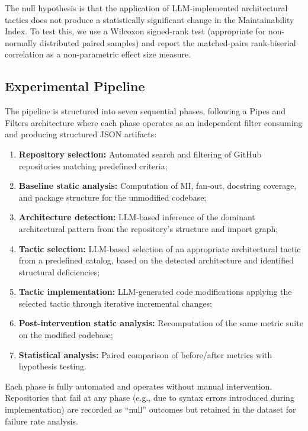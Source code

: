 \documentclass[sigconf,review,anonymous]{acmart}
\begin{document}
The null hypothesis is that the application of LLM-implemented architectural tactics does not produce a statistically significant change in the Maintainability Index. To test this, we use a Wilcoxon signed-rank test (appropriate for non-normally distributed paired samples) and report the matched-pairs rank-biserial correlation as a non-parametric effect size measure.

\subsection{Experimental Pipeline}
The pipeline is structured into seven sequential phases, following a Pipes and Filters architecture where each phase operates as an independent filter consuming and producing structured JSON artifacts:
\begin{enumerate}[nosep]
    \item \textbf{Repository selection:} Automated search and filtering of GitHub repositories matching predefined criteria;
    \item \textbf{Baseline static analysis:} Computation of MI, fan-out, docstring coverage, and package structure for the unmodified codebase;
    \item \textbf{Architecture detection:} LLM-based inference of the dominant architectural pattern from the repository's structure and import graph;
    \item \textbf{Tactic selection:} LLM-based selection of an appropriate architectural tactic from a predefined catalog, based on the detected architecture and identified structural deficiencies;
    \item \textbf{Tactic implementation:} LLM-generated code modifications applying the selected tactic through iterative incremental changes;
    \item \textbf{Post-intervention static analysis:} Recomputation of the same metric suite on the modified codebase;
    \item \textbf{Statistical analysis:} Paired comparison of before/after metrics with hypothesis testing.
\end{enumerate}

Each phase is fully automated and operates without manual intervention. Repositories that fail at any phase (e.g., due to syntax errors introduced during implementation) are recorded as ``null'' outcomes but retained in the dataset for failure rate analysis.
\end{document}
